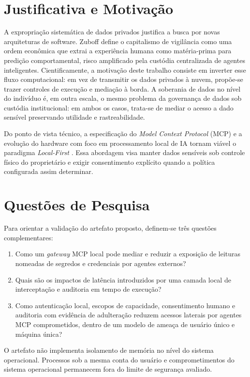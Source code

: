 \section{Justificativa e Motivação}
A expropriação sistemática de dados privados justifica a busca por novas arquiteturas de software. Zuboff \cite{zuboff2019} define o capitalismo de vigilância como uma ordem econômica que extrai a experiência humana como matéria-prima para predição comportamental, risco amplificado pela custódia centralizada de agentes inteligentes. Cientificamente, a motivação deste trabalho consiste em inverter esse fluxo computacional: em vez de transmitir os dados privados à nuvem, propõe-se trazer controles de execução e mediação à borda. A soberania de dados no nível do indivíduo é, em outra escala, o mesmo problema da governança de dados sob custódia institucional: em ambos os casos, trata-se de mediar o acesso a dado sensível preservando utilidade e rastreabilidade.

Do ponto de vista técnico, a especificação do \textit{Model Context Protocol} (MCP) \cite{anthropic2024} e a evolução do hardware com foco em processamento local de IA tornam viável o paradigma \textit{Local-First} \cite{kleppmann2019}. Essa abordagem visa manter dados sensíveis sob controle físico do proprietário e exigir consentimento explícito quando a política configurada assim determinar.

\section{Questões de Pesquisa}
Para orientar a validação do artefato proposto, definem-se três questões complementares:
\begin{enumerate}
\item Como um \textit{gateway} MCP local pode mediar e reduzir a exposição de leituras nomeadas de segredos e credenciais por agentes externos?
\item Quais são os impactos de latência introduzidos por uma camada local de interceptação e auditoria em tempo de execução?
\item Como autenticação local, escopos de capacidade, consentimento humano e auditoria com evidência de adulteração reduzem acessos laterais por agentes MCP comprometidos, dentro de um modelo de ameaça de usuário único e máquina única?
\end{enumerate}
O artefato não implementa isolamento de memória no nível do sistema operacional. Processos sob a mesma conta do usuário e comprometimentos do sistema operacional permanecem fora do limite de segurança avaliado.

